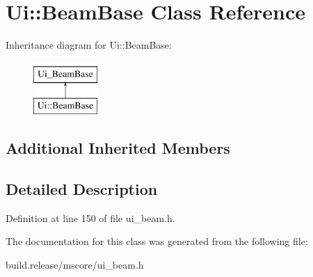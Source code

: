 \hypertarget{class_ui_1_1_beam_base}{}\section{Ui\+:\+:Beam\+Base Class Reference}
\label{class_ui_1_1_beam_base}
Inheritance diagram for Ui\+:\+:Beam\+Base\+:\begin{figure}[H]
\begin{center}
\leavevmode
\includegraphics[height=2.000000cm]{class_ui_1_1_beam_base}
\end{center}
\end{figure}
\subsection*{Additional Inherited Members}


\subsection{Detailed Description}


Definition at line 150 of file ui\+\_\+beam.\+h.



The documentation for this class was generated from the following file\+:\begin{DoxyCompactItemize}
\item 
build.\+release/mscore/ui\+\_\+beam.\+h\end{DoxyCompactItemize}
